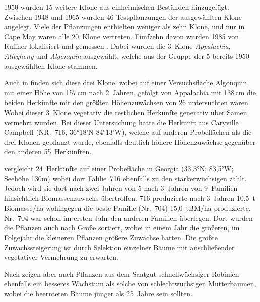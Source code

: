 \documentclass[twocolumn]{scrartcl}
\begin{document}
1950 wurden 15 weitere Klone aus einheimischen Beständen hinzugefügt.
Zwischen 1948 und 1965 wurden 46 Testpflanzungen der ausgewählten
Klone angelegt. Viele der Pflanzungen enthielten weniger als zehn
Klone, und nur in Cape May waren alle 20~Klone vertreten. Fünfzehn
davon wurden 1985 von Ruffner lokalisiert und gemessen
\citep{bongarten1992robinie}. Dabei wurden die 3~Klone
\emph{Appalachia}, \emph{Allegheny} und \emph{Algonquin} ausgewählt,
welche aus der Gruppe der 5 bereits 1950 ausgewählten Klone stammen.

Auch in \citet{bridgen1988robinie} finden sich diese drei Klone, wobei
auf einer Versuchsfläche Algonquin mit einer Höhe von 157\,cm nach
2~Jahren, gefolgt von Appalachia mit 138\,cm die beiden Herkünfte mit
den größten Höhenzuwächsen von 26 untersuchten waren. Wobei dieser
3~Klone vegetativ die restlichen Herkünfte generativ über Samen
vermehrt wurden. Bei dieser Untersuchung hatte die Herkunft aus
Caryville Campbell (NR.\ 716, 36°18'N 84°13'W), welche auf anderen
Probeflächen als die drei Klonen gepflanzt wurde, ebenfalls deutlich
höhere Höhenzuwächse gegenüber den anderen 55~Herkünften.

\citet{bongarten1992robineSelektion} vergleicht 24~Herkünfte auf einer
Probefläche in Georgia (33,3°N; 83,5°W; Seehöhe 130m) wobei dort
Falilie~716 ebenfalls zu den stärkerwüchsigen zählt. Jedoch wird sie
dort nach zwei Jahren von 5 nach 3~Jahren von 9~Familien hinsichtlich
Biomassenzuwachs übertroffen. 716 produzierte nach 3~Jahren 10,5~t
Biomasse/ha wohingegen die beste Familie (Nr.~704) 15,0~tBM/ha
produzierte. Nr.~704 war schon im ersten Jahr den anderen Familien
überlegen.  Dort wurden die Pflanzen auch nach Größe sortiert, wobei
in einem Jahr die größeren, im Folgejahr die kleineren Pflanzen
größere Zuwächse hatten. Die größte Zuwachssteigerung ist durch
Selektion einzelner Bäume mit anschließender vegetativer Vermehrung zu
erwarten.

Nach \citet{cummings1947robinie} zeigen aber auch Pflanzen aus dem
Saatgut schnellwüchsiger Robinien ebenfalls ein besseres Wachstum als
solche von schlechtwüchsigen Mutterbäumen, wobei die beernteten Bäume
jünger als 25~Jahre sein sollten.
\end{document}
